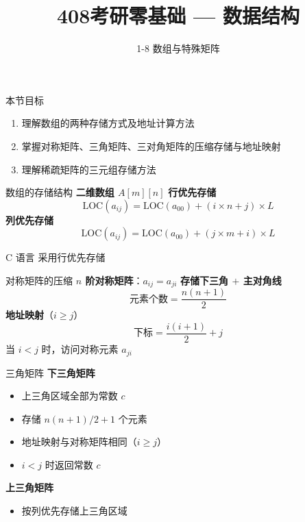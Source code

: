 \documentclass[10pt, aspectratio=169]{beamer}
\title{408考研零基础 --- 数据结构}
\subtitle{1-8 数组与特殊矩阵}
\author{}
\date{}
\begin{document}
\begin{frame}{本节目标}
    \begin{enumerate}
        \item 理解数组的两种存储方式及地址计算方法
        \item 掌握对称矩阵、三角矩阵、三对角矩阵的压缩存储与地址映射
        \item 理解稀疏矩阵的三元组存储方法
    \end{enumerate}
\end{frame}

\begin{frame}{数组的存储结构}
    \textbf{二维数组 $A[m][n]$}
    \vspace{0.3em}
    \textbf{行优先存储}
    \[
    \text{LOC}(a_{ij}) = \text{LOC}(a_{00}) + (i \times n + j) \times L
    \]
    \vspace{0.3em}
    \textbf{列优先存储}
    \[
    \text{LOC}(a_{ij}) = \text{LOC}(a_{00}) + (j \times m + i) \times L
    \]
    \vspace{0.3em}
    \begin{block}{C 语言}
        采用行优先存储
    \end{block}
\end{frame}

\begin{frame}{对称矩阵的压缩}
    \textbf{$n$ 阶对称矩阵}：$a_{ij} = a_{ji}$
    \vspace{0.3em}
    \textbf{存储下三角 $+$ 主对角线}
    \[
    \text{元素个数} = \frac{n(n+1)}{2}
    \]
    \vspace{0.3em}
    \textbf{地址映射}（$i \ge j$）
    \[
    \text{下标} = \frac{i(i+1)}{2} + j
    \]
    \vspace{0.3em}
    当 $i < j$ 时，访问对称元素 $a_{ji}$
\end{frame}

\begin{frame}{三角矩阵}
    \textbf{下三角矩阵}
    \begin{itemize}
        \item 上三角区域全部为常数 $c$
        \item 存储 $n(n+1)/2 + 1$ 个元素
        \item 地址映射与对称矩阵相同（$i \ge j$）
        \item $i < j$ 时返回常数 $c$
    \end{itemize}
    \vspace{0.3em}
    \textbf{上三角矩阵}
    \begin{itemize}
        \item 按列优先存储上三角区域
    \end{itemize}
\end{frame}
\end{document}
